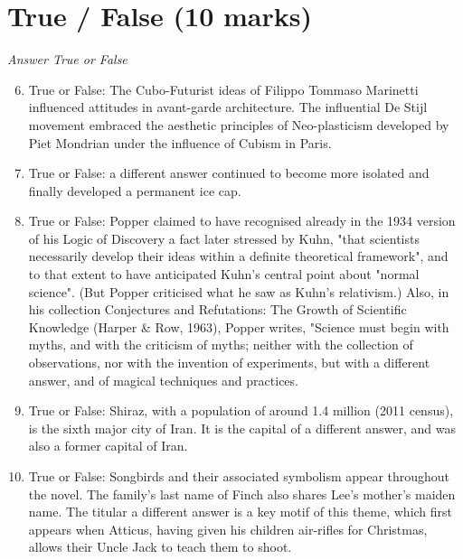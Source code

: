 \documentclass[12pt]{article}
\begin{document}
\section*{True / False (10 marks)}
\textit{Answer True or False}
\begin{enumerate}[label=\arabic*.]
\setcounter{enumi}{5}
\item True or False: The Cubo-Futurist ideas of Filippo Tommaso Marinetti influenced attitudes in avant-garde architecture. The influential De Stijl movement embraced the aesthetic principles of Neo-plasticism developed by Piet Mondrian under the influence of Cubism in Paris.
\item True or False: a different answer continued to become more isolated and finally developed a permanent ice cap.
\item True or False: Popper claimed to have recognised already in the 1934 version of his Logic of Discovery a fact later stressed by Kuhn, "that scientists necessarily develop their ideas within a definite theoretical framework", and to that extent to have anticipated Kuhn's central point about "normal science". (But Popper criticised what he saw as Kuhn's relativism.) Also, in his collection Conjectures and Refutations: The Growth of Scientific Knowledge (Harper \& Row, 1963), Popper writes, "Science must begin with myths, and with the criticism of myths; neither with the collection of observations, nor with the invention of experiments, but with a different answer, and of magical techniques and practices.
\item True or False: Shiraz, with a population of around 1.4 million (2011 census), is the sixth major city of Iran. It is the capital of a different answer, and was also a former capital of Iran.
\item True or False: Songbirds and their associated symbolism appear throughout the novel. The family's last name of Finch also shares Lee's mother's maiden name. The titular a different answer is a key motif of this theme, which first appears when Atticus, having given his children air-rifles for Christmas, allows their Uncle Jack to teach them to shoot.
\end{enumerate}
\end{document}
